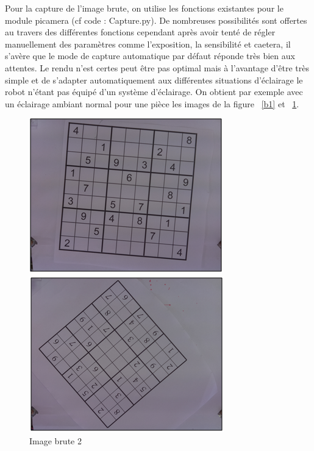 \documentclass[12pt]{article}
\begin{document}
Pour la capture de l'image brute, on utilise les fonctions existantes pour le module picamera (cf code : Capture.py). De nombreuses possibilités sont offertes au travers des différentes fonctions cependant après avoir tenté de régler manuellement des paramètres comme l'exposition, la sensibilité et caetera, il s'avère que le mode de capture automatique par défaut réponde très bien aux attentes. Le rendu n'est certes peut être pas optimal mais à l'avantage d'être très simple et de s'adapter automatiquement aux différentes situations d'éclairage le robot n'étant pas équipé d'un système d'éclairage. On obtient par exemple avec un éclairage ambiant normal pour une pièce les images de la figure ~\ref{b1} et ~\ref{b2}.
\begin{figure}[!h]
\centering
\begin{minipage}{.5\textwidth}
  \centering
  \includegraphics[scale = 0.65]{b12.png}
  \caption{\label{b1} Image brute 1}
\end{minipage}%
\begin{minipage}{.5\textwidth}
  \centering
  \includegraphics[scale = 0.65]{b13.png}
  \caption{\label{b2} Image brute 2}
\end{minipage}
\end{figure}\\
\end{document}
